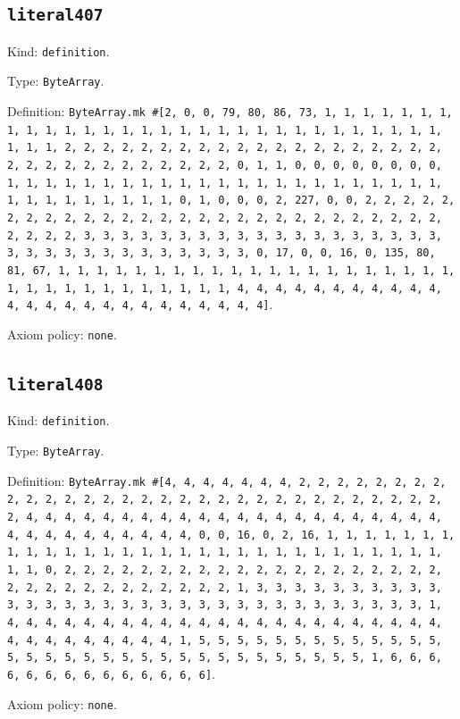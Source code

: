 \documentclass[11pt]{article}
\begin{document}
\subsection*{\texttt{literal407}}
\noindent Kind: \texttt{definition}.\par
\noindent Type: \texttt{ByteArray}.\par
\noindent Definition: \texttt{ByteArray.mk \#[2, 0, 0, 79, 80, 86, 73, 1, 1, 1, 1, 1, 1, 1, 1, 1, 1, 1, 1, 1, 1, 1, 1, 1, 1, 1, 1, 1, 1, 1, 1, 1, 1, 1, 1, 1, 1, 1, 1, 1, 2, 2, 2, 2, 2, 2, 2, 2, 2, 2, 2, 2, 2, 2, 2, 2, 2, 2, 2, 2, 2, 2, 2, 2, 2, 2, 2, 2, 2, 2, 2, 2, 0, 1, 1, 0, 0, 0, 0, 0, 0, 0, 0, 1, 1, 1, 1, 1, 1, 1, 1, 1, 1, 1, 1, 1, 1, 1, 1, 1, 1, 1, 1, 1, 1, 1, 1, 1, 1, 1, 1, 1, 1, 1, 1, 0, 1, 0, 0, 0, 2, 227, 0, 0, 2, 2, 2, 2, 2, 2, 2, 2, 2, 2, 2, 2, 2, 2, 2, 2, 2, 2, 2, 2, 2, 2, 2, 2, 2, 2, 2, 2, 2, 2, 2, 2, 3, 3, 3, 3, 3, 3, 3, 3, 3, 3, 3, 3, 3, 3, 3, 3, 3, 3, 3, 3, 3, 3, 3, 3, 3, 3, 3, 3, 3, 3, 3, 3, 0, 17, 0, 0, 16, 0, 135, 80, 81, 67, 1, 1, 1, 1, 1, 1, 1, 1, 1, 1, 1, 1, 1, 1, 1, 1, 1, 1, 1, 1, 1, 1, 1, 1, 1, 1, 1, 1, 1, 1, 1, 1, 1, 4, 4, 4, 4, 4, 4, 4, 4, 4, 4, 4, 4, 4, 4, 4, 4, 4, 4, 4, 4, 4, 4, 4, 4, 4]}.\par
\noindent Axiom policy: \texttt{none}.\par
\subsection*{\texttt{literal408}}
\noindent Kind: \texttt{definition}.\par
\noindent Type: \texttt{ByteArray}.\par
\noindent Definition: \texttt{ByteArray.mk \#[4, 4, 4, 4, 4, 4, 4, 2, 2, 2, 2, 2, 2, 2, 2, 2, 2, 2, 2, 2, 2, 2, 2, 2, 2, 2, 2, 2, 2, 2, 2, 2, 2, 2, 2, 2, 2, 2, 2, 4, 4, 4, 4, 4, 4, 4, 4, 4, 4, 4, 4, 4, 4, 4, 4, 4, 4, 4, 4, 4, 4, 4, 4, 4, 4, 4, 4, 4, 4, 4, 4, 0, 0, 16, 0, 2, 16, 1, 1, 1, 1, 1, 1, 1, 1, 1, 1, 1, 1, 1, 1, 1, 1, 1, 1, 1, 1, 1, 1, 1, 1, 1, 1, 1, 1, 1, 1, 1, 1, 0, 2, 2, 2, 2, 2, 2, 2, 2, 2, 2, 2, 2, 2, 2, 2, 2, 2, 2, 2, 2, 2, 2, 2, 2, 2, 2, 2, 2, 2, 2, 2, 2, 1, 3, 3, 3, 3, 3, 3, 3, 3, 3, 3, 3, 3, 3, 3, 3, 3, 3, 3, 3, 3, 3, 3, 3, 3, 3, 3, 3, 3, 3, 3, 3, 3, 1, 4, 4, 4, 4, 4, 4, 4, 4, 4, 4, 4, 4, 4, 4, 4, 4, 4, 4, 4, 4, 4, 4, 4, 4, 4, 4, 4, 4, 4, 4, 4, 4, 1, 5, 5, 5, 5, 5, 5, 5, 5, 5, 5, 5, 5, 5, 5, 5, 5, 5, 5, 5, 5, 5, 5, 5, 5, 5, 5, 5, 5, 5, 5, 5, 5, 1, 6, 6, 6, 6, 6, 6, 6, 6, 6, 6, 6, 6, 6, 6]}.\par
\noindent Axiom policy: \texttt{none}.\par
\end{document}
